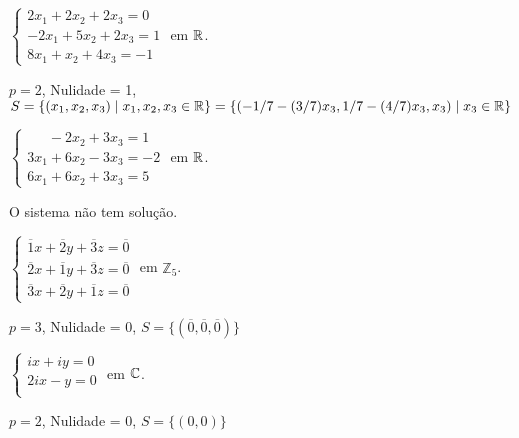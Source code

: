 \documentclass[12pt]{exam}
\newcommand{\integer}{\mathbb{Z}}
\begin{document}
\begin{exercicio}
  $
    \begin{cases}
      2x_1 + 2x_2 + 2x_3 = 0\\
      -2x_1 + 5x_2 + 2x_3 = 1\\
      8x_1 + x_2 + 4x_3 = -1
    \end{cases}
  $
  em $\mathbb{R}$.
  \begin{solucao}
    $p = 2$, Nulidade = 1, $S = \{(x_1, x_2, x_3) \mid x_1, x_2, x_3 \in \mathbb{R}\} = \{(-1/7 - (3/7)x_3, 1/7 - (4/7)x_3, x_3) \mid x_3 \in \mathbb{R}\}$
  \end{solucao}
\end{exercicio}

\begin{exercicio}
  $
    \begin{cases}
      \phantom{2x_1} - 2x_2 + 3x_3 = 1\\
      3x_1 + 6x_2 - 3x_3 = -2\\
      6x_1 + 6x_2 + 3x_3 = 5
    \end{cases}
  $
  em $\mathbb{R}$.
  \begin{solucao}
    O sistema n\~ao tem solu\c{c}\~ao.
  \end{solucao}
\end{exercicio}

\begin{exercicio}
  $
    \begin{cases}
      \overline{1}x + \overline{2}y + \overline{3}z = \overline{0}\\
      \overline{2}x + \overline{1}y + \overline{3}z = \overline{0}\\
      \overline{3}x + \overline{2}y + \overline{1}z = \overline{0}
    \end{cases}
  $
  em $\integer_5$.
  \begin{solucao}
    $p = 3$, Nulidade = 0, $S = \{(\overline{0},\overline{0},\overline{0})\}$
  \end{solucao}
\end{exercicio}

\begin{exercicio}
  $
    \begin{cases}
      ix + iy = 0\\
      2ix - y = 0\\
    \end{cases}
  $
  em $\mathbb{C}$.
  \begin{solucao}
    $p = 2$, Nulidade = 0, $S = \{(0, 0)\}$
  \end{solucao}
\end{exercicio}
\end{document}
